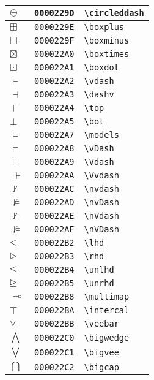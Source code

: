 \begin{longtable}{|l|l|l|}
\hline
$\circleddash$ & \texttt{0000229D} & \verb|\circleddash| \\
\hline
$\boxplus$ & \texttt{0000229E} & \verb|\boxplus| \\
\hline
$\boxminus$ & \texttt{0000229F} & \verb|\boxminus| \\
\hline
$\boxtimes$ & \texttt{000022A0} & \verb|\boxtimes| \\
\hline
$\boxdot$ & \texttt{000022A1} & \verb|\boxdot| \\
\hline
$\vdash$ & \texttt{000022A2} & \verb|\vdash| \\
\hline
$\dashv$ & \texttt{000022A3} & \verb|\dashv| \\
\hline
$\top$ & \texttt{000022A4} & \verb|\top| \\
\hline
$\bot$ & \texttt{000022A5} & \verb|\bot| \\
\hline
$\models$ & \texttt{000022A7} & \verb|\models| \\
\hline
$\vDash$ & \texttt{000022A8} & \verb|\vDash| \\
\hline
$\Vdash$ & \texttt{000022A9} & \verb|\Vdash| \\
\hline
$\Vvdash$ & \texttt{000022AA} & \verb|\Vvdash| \\
\hline
$\nvdash$ & \texttt{000022AC} & \verb|\nvdash| \\
\hline
$\nvDash$ & \texttt{000022AD} & \verb|\nvDash| \\
\hline
$\nVdash$ & \texttt{000022AE} & \verb|\nVdash| \\
\hline
$\nVDash$ & \texttt{000022AF} & \verb|\nVDash| \\
\hline
$\lhd$ & \texttt{000022B2} & \verb|\lhd| \\
\hline
$\rhd$ & \texttt{000022B3} & \verb|\rhd| \\
\hline
$\unlhd$ & \texttt{000022B4} & \verb|\unlhd| \\
\hline
$\unrhd$ & \texttt{000022B5} & \verb|\unrhd| \\
\hline
$\multimap$ & \texttt{000022B8} & \verb|\multimap| \\
\hline
$\intercal$ & \texttt{000022BA} & \verb|\intercal| \\
\hline
$\veebar$ & \texttt{000022BB} & \verb|\veebar| \\
\hline
$\bigwedge$ & \texttt{000022C0} & \verb|\bigwedge| \\
\hline
$\bigvee$ & \texttt{000022C1} & \verb|\bigvee| \\
\hline
$\bigcap$ & \texttt{000022C2} & \verb|\bigcap| \\

\end{longtable}
